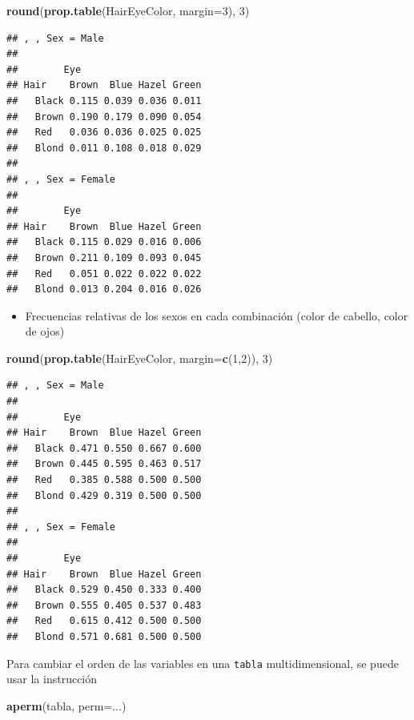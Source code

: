 \documentclass[]{book}
\newenvironment{Shaded}{\begin{snugshade}}{\end{snugshade}}
\newcommand{\DataTypeTok}[1]{\textcolor[rgb]{0.13,0.29,0.53}{#1}}
\newcommand{\DecValTok}[1]{\textcolor[rgb]{0.00,0.00,0.81}{#1}}
\newcommand{\KeywordTok}[1]{\textcolor[rgb]{0.13,0.29,0.53}{\textbf{#1}}}
\newcommand{\NormalTok}[1]{#1}
\providecommand{\tightlist}{%
  \setlength{\itemsep}{0pt}\setlength{\parskip}{0pt}}
\theoremstyle{definition}
\theoremstyle{definition}
\theoremstyle{definition}
\theoremstyle{remark}
\begin{document}
\begin{Shaded}
\begin{Highlighting}[]
\KeywordTok{round}\NormalTok{(}\KeywordTok{prop.table}\NormalTok{(HairEyeColor, }\DataTypeTok{margin=}\DecValTok{3}\NormalTok{), }\DecValTok{3}\NormalTok{)}
\end{Highlighting}
\end{Shaded}

\begin{verbatim}
## , , Sex = Male
## 
##        Eye
## Hair    Brown  Blue Hazel Green
##   Black 0.115 0.039 0.036 0.011
##   Brown 0.190 0.179 0.090 0.054
##   Red   0.036 0.036 0.025 0.025
##   Blond 0.011 0.108 0.018 0.029
## 
## , , Sex = Female
## 
##        Eye
## Hair    Brown  Blue Hazel Green
##   Black 0.115 0.029 0.016 0.006
##   Brown 0.211 0.109 0.093 0.045
##   Red   0.051 0.022 0.022 0.022
##   Blond 0.013 0.204 0.016 0.026
\end{verbatim}

\begin{itemize}
\tightlist
\item
  Frecuencias relativas de los sexos en cada combinación (color de cabello, color de ojos)
\end{itemize}

\begin{Shaded}
\begin{Highlighting}[]
\KeywordTok{round}\NormalTok{(}\KeywordTok{prop.table}\NormalTok{(HairEyeColor, }\DataTypeTok{margin=}\KeywordTok{c}\NormalTok{(}\DecValTok{1}\NormalTok{,}\DecValTok{2}\NormalTok{)), }\DecValTok{3}\NormalTok{)}
\end{Highlighting}
\end{Shaded}

\begin{verbatim}
## , , Sex = Male
## 
##        Eye
## Hair    Brown  Blue Hazel Green
##   Black 0.471 0.550 0.667 0.600
##   Brown 0.445 0.595 0.463 0.517
##   Red   0.385 0.588 0.500 0.500
##   Blond 0.429 0.319 0.500 0.500
## 
## , , Sex = Female
## 
##        Eye
## Hair    Brown  Blue Hazel Green
##   Black 0.529 0.450 0.333 0.400
##   Brown 0.555 0.405 0.537 0.483
##   Red   0.615 0.412 0.500 0.500
##   Blond 0.571 0.681 0.500 0.500
\end{verbatim}

Para cambiar el orden de las variables en una \texttt{tabla} multidimensional, se puede usar la instrucción

\begin{Shaded}
\begin{Highlighting}[]
\KeywordTok{aperm}\NormalTok{(tabla, }\DataTypeTok{perm=}\NormalTok{...)}
\end{Highlighting}
\end{Shaded}
\end{document}
